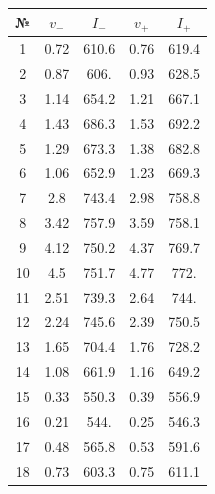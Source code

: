 \documentclass[a4paper, 12pt]{article}
\begin{document}
\begin{enumerate}
\begin{enumerate}
				\begin{figure}[h]
			\begin{minipage}{0.49\textwidth}
				\begin{tabular}{|c|c|c|c|c|}
					\hline
					№ & $v_-$ & $I_-$ & $v_+$ & $I_+$\\
					\hline
					1 & 0.72 & 610.6 & 0.76 & 619.4 \\
					2 & 0.87 & 606. & 0.93 & 628.5 \\
 					3 & 1.14 & 654.2 & 1.21 & 667.1 \\
 					4 & 1.43 & 686.3 & 1.53 & 692.2 \\
 					5 & 1.29 & 673.3 & 1.38 & 682.8 \\
 					6 & 1.06 & 652.9 & 1.23 & 669.3 \\
 					7 & 2.8 & 743.4 & 2.98 & 758.8 \\
 					8 & 3.42 & 757.9 & 3.59 & 758.1 \\
 					9 & 4.12 & 750.2 & 4.37 & 769.7 \\
 					10 & 4.5 & 751.7 & 4.77 & 772. \\
 					11 & 2.51 & 739.3 & 2.64 & 744. \\
 					12 & 2.24 & 745.6 & 2.39 & 750.5 \\
 					13 & 1.65 & 704.4 & 1.76 & 728.2 \\
 					14 & 1.08 & 661.9 & 1.16 & 649.2 \\
					15 & 0.33 & 550.3 & 0.39 & 556.9 \\
 					16 & 0.21 & 544. & 0.25 & 546.3 \\
 					17 & 0.48 & 565.8 & 0.53 & 591.6 \\
 					18 & 0.73 & 603.3 & 0.75 & 611.1 \\
					\hline
				\end{tabular}
				\end{minipage}
				\hfil
				\begin{minipage}{0.55\textwidth}
\end{minipage}
\end{figure}
\end{enumerate}
\end{enumerate}
\end{document}
